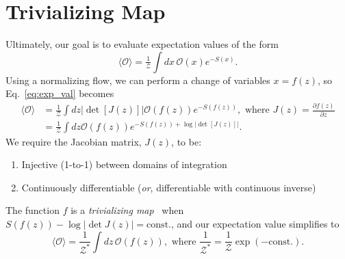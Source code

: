 \documentclass[a4paper,11pt]{article}
\begin{document}
\section{\label{sec:trivializing_map}Trivializing Map}
%
Ultimately, our goal is to evaluate expectation values of the form
%
\begin{equation}
    \label{eq:exp_val}
    \langle \mathcal{O} \rangle = \tfrac{1}{\mathcal{Z}} \int dx\, \mathcal{O} (x) e^{-S(x)}.
\end{equation}
%
Using a normalizing flow, we can perform a change of variables \(x = f(z)\), so
Eq.~\ref{eq:exp_val} becomes
%
\begin{align}
    \langle \mathcal{O} \rangle 
    &= \frac{1}{\mathcal{Z}} \int dz \left|\det \left[ J(z) \right]\right|
        \mathcal{O} (f(z)) e^{-S(f(z))},
        \text{ where } J (z) = \frac{\partial f(z)}{\partial z} \\
    &= \frac{1}{\mathcal{Z}}\int dz \mathcal{O} (f(z)) e^{-S(f(z))
        + \log |\det[J(z)]|}.
\end{align}
%
We require the Jacobian matrix, \(J(z)\), to be:
%
\begin{enumerate}
    \item Injective (1-to-1) between domains of integration
    \item Continuously differentiable (\emph{or}, differentiable with
        continuous inverse)
\end{enumerate}
%
The function \(f\) is a \emph{trivializing map}~\cite{luscher2009} when
\(S(f(z)) - \log\left|\det J(z)\right| = \text{const.}\), and our expectation
value simplifies to
%
\begin{equation}
    \langle\mathcal{O}\rangle = 
    \frac{1}{\mathcal{Z}^{\ast}}\int dz\, \mathcal{O}(f(z)), \text{ where }
    \frac{1}{\mathcal{Z}^{\ast}} 
    = \frac{1}{\mathcal{Z}}\exp(-\text{const.}).
\end{equation}
%
\end{document}

